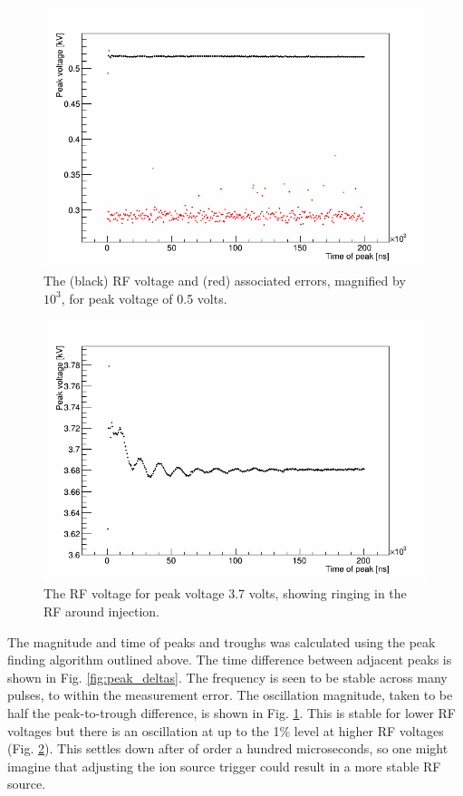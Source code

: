 \documentclass{paper}
\begin{document}
\begin{figure}
	\centering
		\includegraphics[width=\textwidth]{images/V=1_03_rf_voltage}
	\caption{The (black) RF voltage and (red) associated errors, magnified by
           $10^3$, for peak voltage of 0.5 volts.}
	\label{fig:rf_voltage}
\end{figure}

\begin{figure}
	\centering
		\includegraphics[width=\textwidth]{images/V=7_35_rf_voltage_zoom}
	\caption{The RF voltage for peak voltage 3.7 volts, showing ringing in
           the RF around injection.}
	\label{fig:rf_voltage_ringing}
\end{figure}

The magnitude and time of peaks and troughs was calculated using the peak 
finding algorithm outlined above. The time difference between adjacent peaks is
shown in Fig. \ref{fig:peak_deltas}. The frequency is seen to be stable across
many pulses, to within the measurement error. The oscillation magnitude, 
taken to be half the peak-to-trough difference, is shown in Fig. 
\ref{fig:rf_voltage}. This is stable for lower RF voltages but there is an 
oscillation at up to the 1$\%$ level at higher RF voltages (Fig. 
\ref{fig:rf_voltage_ringing}). This settles down
after of order a hundred microseconds, so one might imagine that adjusting the
ion source trigger could result in a more stable RF source.
\end{document}
